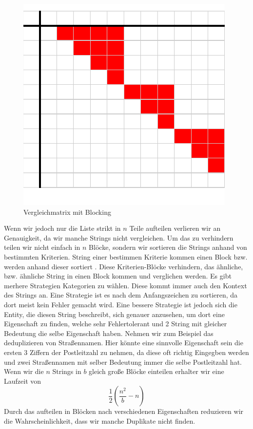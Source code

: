 \documentclass[sigconf]{acmart}
\begin{document}
\begin{figure}[htbp]
  \centering
  \includegraphics{table2.pdf}
  \caption{Vergleichmatrix mit Blocking}
  \label{abb:matrixblock}
\end{figure}

Wenn wir jedoch nur die Liste strikt in $n$
Teile aufteilen verlieren wir an Genauigkeit, da wir
manche Strings nicht vergleichen.
Um das zu verhindern teilen wir nicht einfach in $n$
Blöcke, sondern wir sortieren die Strings anhand von 
bestimmten Kriterien. String einer bestimmen Kriterie kommen
einen Block bzw. werden anhand dieser sortiert \cite[Vlg. S. 11]{elmagarmid1}. 
Diese Kriterien-Blöcke verhindern, das
ähnliche, bzw. ähnliche String in einen Block kommen 
und verglichen werden.
Es gibt merhere Strategien Kategorien zu wählen. Diese
kommt immer auch den Kontext des Strings an.
Eine Strategie ist es nach dem Anfangszeichen zu 
sortieren, da dort meist kein Fehler gemacht wird.
Eine bessere Strategie ist jedoch sich die Entity,
die diesen String beschreibt, sich genauer anzusehen,
um dort eine Eigenschaft zu finden, welche sehr 
Fehlertolerant und 2 String mit gleicher Bedeutung
die selbe Eigenschaft haben.
Nehmen wir zum Beispiel das deduplizieren von 
Straßennamen. Hier könnte eine sinnvolle
Eigenschaft sein die ersten 3 Ziffern der 
Postleitzahl zu nehmen, da diese oft richtig 
Eingegben werden und zwei Straßennamen mit selber
Bedeutung immer die selbe Postleitzahl hat.
Wenn wir die $n$ Strings in $b$ gleich große Blöcke
einteilen erhalter wir eine Laufzeit von
$$\frac{1}{2} (\frac{n^2}{b}-n)$$
Durch das aufteilen in Blöcken nach verschiedenen
Eigenschaften reduzieren wir die Wahrscheinlichkeit,
dass wir manche Duplikate nicht finden.
\end{document}
